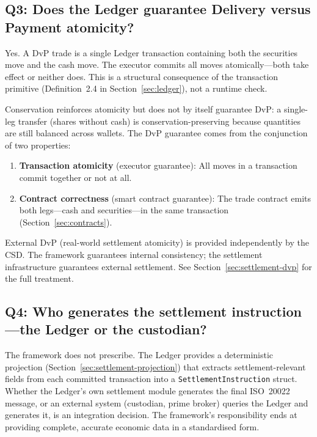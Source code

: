 \documentclass[11pt,a4paper]{article}
\begin{document}
\subsection*{Q3: Does the Ledger guarantee Delivery versus Payment atomicity?}

Yes. A DvP trade is a single Ledger transaction containing both the securities move and the cash move. The executor commits all moves atomically---both take effect or neither does. This is a structural consequence of the transaction primitive (Definition~2.4 in Section~\ref{sec:ledger}), not a runtime check.

Conservation reinforces atomicity but does not by itself guarantee DvP: a single-leg transfer (shares without cash) is conservation-preserving because quantities are still balanced across wallets. The DvP guarantee comes from the conjunction of two properties:

\begin{enumerate}[nosep]
\item \textbf{Transaction atomicity} (executor guarantee): All moves in a transaction commit together or not at all.
\item \textbf{Contract correctness} (smart contract guarantee): The trade contract emits both legs---cash and securities---in the same transaction (Section~\ref{sec:contracts}).
\end{enumerate}

\noindent External DvP (real-world settlement atomicity) is provided independently by the CSD. The framework guarantees internal consistency; the settlement infrastructure guarantees external settlement. See Section~\ref{sec:settlement-dvp} for the full treatment.

\subsection*{Q4: Who generates the settlement instruction---the Ledger or the custodian?}

The framework does not prescribe. The Ledger provides a deterministic projection (Section~\ref{sec:settlement-projection}) that extracts settlement-relevant fields from each committed transaction into a \texttt{SettlementInstruction} struct. Whether the Ledger's own settlement module generates the final ISO~20022 message, or an external system (custodian, prime broker) queries the Ledger and generates it, is an integration decision. The framework's responsibility ends at providing complete, accurate economic data in a standardised form.
\end{document}
